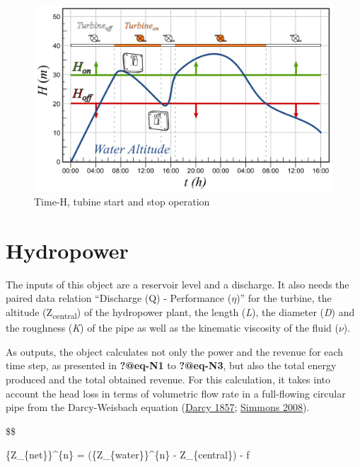 \documentclass[
  letterpaper,
  DIV=11,
  numbers=noendperiod]{scrreprt}
\begin{document}
\begin{figure}

{\centering \includegraphics{./figures/fig-model_turbine.png}

}

\caption{\label{fig-model_turbine}Time-H, tubine start and stop
operation}

\end{figure}

\hypertarget{sec-model_hydropower}{%
\chapter{Hydropower}\label{sec-model_hydropower}}

The inputs of this object are a reservoir level and a discharge. It also
needs the paired data relation ``Discharge (Q) - Performance
(\(\eta\))'' for the turbine, the altitude (Z\textsubscript{central}) of
the hydropower plant, the length (\emph{L}), the diameter (\emph{D}) and
the roughness (\emph{K}) of the pipe as well as the kinematic viscosity
of the fluid (\(\nu\)).

As outputs, the object calculates not only the power and the revenue for
each time step, as presented in \textbf{?@eq-N1} to \textbf{?@eq-N3},
but also the total energy produced and the total obtained revenue. For
this calculation, it takes into account the head loss in terms of
volumetric flow rate in a full-flowing circular pipe from the
Darcy-Weisbach equation
(\protect\hyperlink{ref-darcy_recherches_1857}{Darcy 1857};
\protect\hyperlink{ref-simmons_henry_2008}{Simmons 2008}).

\$\$

\{Z\_\{net\}\}\^{}\{n\} = (\{Z\_\{water\}\}\^{}\{n\} - Z\_\{central\}) -
f \cdot {}
\end{document}
